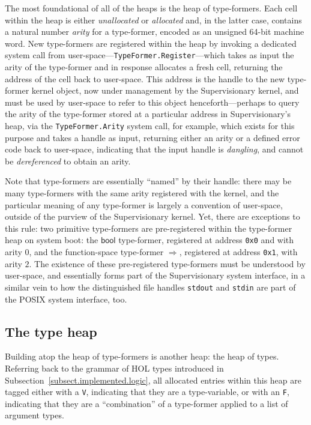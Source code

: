\documentclass[a4paper, UKenglish, cleveref, autoref, thm-restate]{lipics-v2021}
\begin{document}
The most foundational of all of the heaps is the heap of type-formers.
Each cell within the heap is either \emph{unallocated} or \emph{allocated} and, in the latter case, contains a natural number \emph{arity} for a type-former, encoded as an unsigned 64-bit machine word.
New type-formers are registered within the heap by invoking a dedicated system call from user-space---\texttt{TypeFormer.Register}---which takes as input the arity of the type-former and in response allocates a fresh cell, returning the address of the cell back to user-space.
This address is the handle to the new type-former kernel object, now under management by the Supervisionary kernel, and must be used by user-space to refer to this object henceforth---perhaps to query the arity of the type-former stored at a particular address in Supervisionary's heap, via the \texttt{TypeFormer.Arity} system call, for example, which exists for this purpose and takes a handle as input, returning either an arity or a defined error code back to user-space, indicating that the input handle is \emph{dangling}, and cannot be \emph{dereferenced} to obtain an arity.

Note that type-formers are essentially ``named'' by their handle: there may be many type-formers with the same arity registered with the kernel, and the particular meaning of any type-former is largely a convention of user-space, outside of the purview of the Supervisionary kernel.
Yet, there are exceptions to this rule: two primitive type-formers are pre-registered within the type-former heap on system boot: the $\mathsf{bool}$ type-former, registered at address \texttt{0x0} and with arity $0$, and the function-space type-former $\Rightarrow$, registered at address \texttt{0x1}, with arity $2$.
The existence of these pre-registered type-formers must be understood by user-space, and essentially forms part of the Supervisionary system interface, in a similar vein to how the distinguished file handles \texttt{stdout} and \texttt{stdin} are part of the POSIX system interface, too.

\subsection{The type heap}

Building atop the heap of type-formers is another heap: the heap of types.
Referring back to the grammar of HOL types introduced in Subsection~\ref{subsect.implemented.logic}, all allocated entries within this heap are tagged either with a \texttt{V}, indicating that they are a type-variable, or with an \texttt{F}, indicating that they are a ``combination'' of a type-former applied to a list of argument types.
\end{document}
